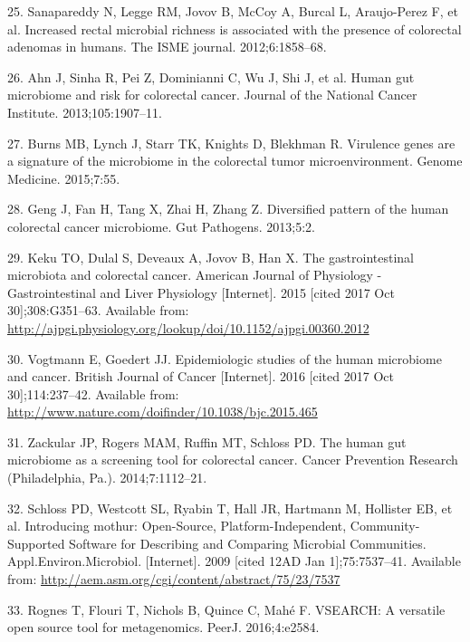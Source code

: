 \documentclass[12pt,]{article}
\begin{document}
\hypertarget{ref-sanapareddy_increased_2012}{}
25. Sanapareddy N, Legge RM, Jovov B, McCoy A, Burcal L, Araujo-Perez F,
et al. Increased rectal microbial richness is associated with the
presence of colorectal adenomas in humans. The ISME journal.
2012;6:1858--68.

\hypertarget{ref-ahn_human_2013}{}
26. Ahn J, Sinha R, Pei Z, Dominianni C, Wu J, Shi J, et al. Human gut
microbiome and risk for colorectal cancer. Journal of the National
Cancer Institute. 2013;105:1907--11.

\hypertarget{ref-burns_virulence_2015}{}
27. Burns MB, Lynch J, Starr TK, Knights D, Blekhman R. Virulence genes
are a signature of the microbiome in the colorectal tumor
microenvironment. Genome Medicine. 2015;7:55.

\hypertarget{ref-geng_diversified_2013}{}
28. Geng J, Fan H, Tang X, Zhai H, Zhang Z. Diversified pattern of the
human colorectal cancer microbiome. Gut Pathogens. 2013;5:2.

\hypertarget{ref-keku_gastrointestinal_2015}{}
29. Keku TO, Dulal S, Deveaux A, Jovov B, Han X. The gastrointestinal
microbiota and colorectal cancer. American Journal of Physiology -
Gastrointestinal and Liver Physiology {[}Internet{]}. 2015 {[}cited 2017
Oct 30{]};308:G351--63. Available from:
\url{http://ajpgi.physiology.org/lookup/doi/10.1152/ajpgi.00360.2012}

\hypertarget{ref-vogtmann_epidemiologic_2016}{}
30. Vogtmann E, Goedert JJ. Epidemiologic studies of the human
microbiome and cancer. British Journal of Cancer {[}Internet{]}. 2016
{[}cited 2017 Oct 30{]};114:237--42. Available from:
\url{http://www.nature.com/doifinder/10.1038/bjc.2015.465}

\hypertarget{ref-zackular_human_2014}{}
31. Zackular JP, Rogers MAM, Ruffin MT, Schloss PD. The human gut
microbiome as a screening tool for colorectal cancer. Cancer Prevention
Research (Philadelphia, Pa.). 2014;7:1112--21.

\hypertarget{ref-schloss_introducing_2009}{}
32. Schloss PD, Westcott SL, Ryabin T, Hall JR, Hartmann M, Hollister
EB, et al. Introducing mothur: Open-Source, Platform-Independent,
Community-Supported Software for Describing and Comparing Microbial
Communities. Appl.Environ.Microbiol. {[}Internet{]}. 2009 {[}cited 12AD
Jan 1{]};75:7537--41. Available from:
\url{http://aem.asm.org/cgi/content/abstract/75/23/7537}

\hypertarget{ref-rognes_vsearch_2016}{}
33. Rognes T, Flouri T, Nichols B, Quince C, Mahé F. VSEARCH: A
versatile open source tool for metagenomics. PeerJ. 2016;4:e2584.
\end{document}
